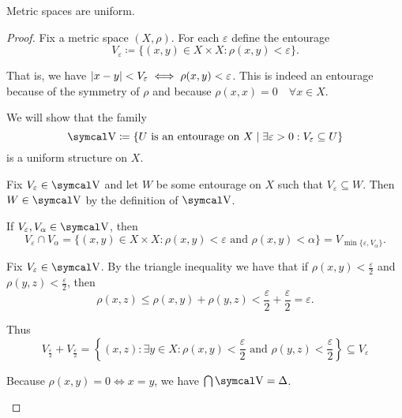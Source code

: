 \begin{proposition}\label{thm:metric_spaces_are_uniform}
  Metric spaces are uniform.
\end{proposition}
\begin{proof}
  Fix a metric space \( (X, \rho) \). For each \( \varepsilon \) define the entourage
  \begin{equation*}
    V_\varepsilon \coloneqq \{ (x, y) \in X \times X \colon \rho(x, y) < \varepsilon \}.
  \end{equation*}

  That is, we have \( \left\vert x - y \right\vert < V_\varepsilon \iff \rho(x, y) < \varepsilon \). This is indeed an entourage because of the symmetry of \( \rho \) and because \( \rho(x, x) = 0 \quad\forall x \in X \).

  We will show that the family
  \begin{equation*}
    \CV \coloneqq \{ U \text{ is an entourage on } X \mid \exists \varepsilon > 0: V_\varepsilon \subseteq U \}
  \end{equation*}
  is a uniform structure on \( X \).

  \begin{description}
     Fix \( V_\varepsilon \in \CV \) and let \( W \) be some entourage on \( X \) such that \( V_\varepsilon \subseteq W \). Then \( W \in \CV \) by the definition of \( \CV \).

     If \( V_\varepsilon, V_\alpha \in \CV \), then
    \begin{equation*}
      V_\varepsilon \cap V_\alpha
      =
      \{ (x, y) \in X \times X \colon \rho(x, y) < \varepsilon \text{ and } \rho(x, y) < \alpha \}
      =
      V_{\min\{\varepsilon, V_\alpha \}}.
    \end{equation*}

     Fix \( V_\varepsilon \in \CV \). By the triangle inequality we have that if \( \rho(x, y) < \frac \varepsilon 2 \) and \( \rho(y, z) < \frac \varepsilon 2 \), then
    \begin{equation*}
       \rho(x, z) \leq \rho(x, y) + \rho(y, z) < \frac \varepsilon 2 + \frac \varepsilon 2 = \varepsilon.
    \end{equation*}

    Thus
    \begin{equation*}
      V_{\frac \varepsilon 2} + V_{\frac \varepsilon 2}
      =
      \left\{ (x, z) \colon \exists y \in X: \rho(x, y) < \frac \varepsilon 2 \text{ and } \rho(y, z) < \frac \varepsilon 2 \right\}
      \subseteq
      V_\varepsilon
    \end{equation*}

     Because \( \rho(x, y) = 0 \iff x = y \), we have \( \bigcap \CV = \Delta \).
  \end{description}
\end{proof}

